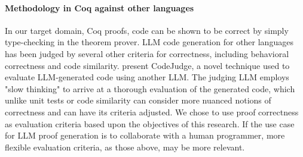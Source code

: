 
\paragraph{Methodology in Coq against other languages}
In our target domain, Coq proofs,
code can be shown to be correct by simply type-checking in the theorem prover.
LLM code generation for other languages
has been judged by several other criteria for correctness,
including behavioral correctness and code similarity.
\citet{CodeJudge} present CodeJudge, a novel technique
used to evaluate LLM-generated code using another LLM.
The judging LLM employs "slow thinking" to arrive at a
thorough evaluation of the generated code,
which unlike unit tests or code similarity can consider
more nuanced notions of correctness and can have its
criteria adjusted.
We chose to use proof correctness as evaluation criteria
based upon the objectives of this research.
If the use case for LLM proof generation is to
collaborate with a human programmer,
more flexible evaluation criteria, as those above, may be more relevant. 


